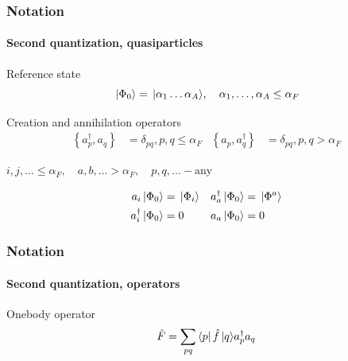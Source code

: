 \begin{frame}[fragile]
    \frametitle{Notation}
    \framesubtitle{Second quantization, quasiparticles}
    \begin{block}{Reference state}
        \begin{equation*}
            \,|{\Phi_0}\rangle = \,|{\alpha_1 \dots \alpha_A}\rangle, \quad \alpha_1, \dots, \alpha_A \leq \alpha_F
        \end{equation*}
    \end{block}
        
    \begin{block}{Creation and annihilation operators}
    \begin{align*}
        \left\{a_p^\dagger, a_q \right\}&= \delta_{pq}, p, q \leq \alpha_F & 
            \left\{a_p, a_q^\dagger \right\} &= \delta_{pq}, p, q > \alpha_F
    \end{align*}
        \begin{center}
        $i,j,\ldots \leq \alpha_F, \quad a,b,\ldots > \alpha_F, \quad p,q, \ldots - \textrm{any}$
        \end{center}
    \begin{align*}
        a_i\,|{\Phi_0}\rangle &= \,|{\Phi_i}\rangle & a_a^\dagger\,|{\Phi_0}\rangle &= \,|{\Phi^a}\rangle \\
        a_i^\dagger\,|{\Phi_0}\rangle &= 0 & a_a\,|{\Phi_0}\rangle &= 0
    \end{align*}
    \end{block}
            
\end{frame}
        
\begin{frame}[fragile]
    \frametitle{Notation}
    \framesubtitle{Second quantization, operators}
        \small
    \begin{block}{Onebody operator}
        \begin{equation*}
            \hat{F} = \sum_{pq} \bra{p}\hat{f}\,|{q}\rangle a_p^\dagger a_q
        \end{equation*}
    \end{block}
\end{frame}

